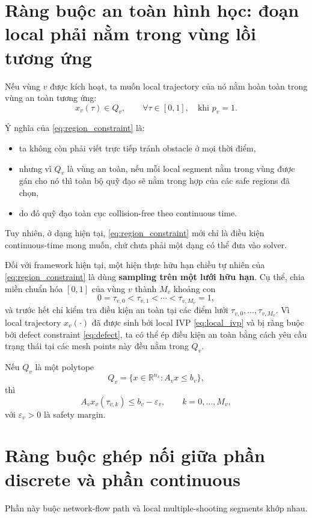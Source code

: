 \documentclass[12pt]{article}
\begin{document}
\section{Ràng buộc an toàn hình học: đoạn local phải nằm trong vùng lồi tương ứng}

Nếu vùng $v$ được kích hoạt, ta muốn local trajectory của nó nằm hoàn toàn trong vùng an toàn tương ứng:
\begin{equation}
x_v(\tau)\in Q_v,
\qquad \forall \tau\in[0,1],
\quad \text{khi } p_v=1.
\label{eq:region_constraint}
\end{equation}

Ý nghĩa của \eqref{eq:region_constraint} là:
\begin{itemize}
    \item ta không còn phải viết trực tiếp tránh obstacle ở mọi thời điểm,
    \item nhưng vì $Q_v$ là vùng an toàn, nếu mỗi local segment nằm trong vùng được gán cho nó thì toàn bộ quỹ đạo sẽ nằm trong hợp của các safe regions đã chọn,
    \item do đó quỹ đạo toàn cục collision-free theo continuous time.
\end{itemize}

Tuy nhiên, ở dạng hiện tại, \eqref{eq:region_constraint} mới chỉ là điều kiện continuous-time mong muốn, chứ chưa phải một dạng có thể đưa vào solver.

Đối với framework hiện tại, một hiện thực hữu hạn chiều tự nhiên của \eqref{eq:region_constraint} là dùng \textbf{sampling trên một lưới hữu hạn}. Cụ thể, chia miền chuẩn hóa $[0,1]$ của vùng $v$ thành $M_v$ khoảng con
\[
0=\tau_{v,0}<\tau_{v,1}<\cdots<\tau_{v,M_v}=1,
\]
và trước hết chỉ kiểm tra điều kiện an toàn tại các điểm lưới $\tau_{v,0},\dots,\tau_{v,M_v}$. Vì local trajectory $x_v(\cdot)$ đã được sinh bởi local IVP \eqref{eq:local_ivp} và bị ràng buộc bởi defect constraint \eqref{eq:defect}, ta có thể ép điều kiện an toàn bằng cách yêu cầu trạng thái tại các mesh points này đều nằm trong $Q_v$.

Nếu $Q_v$ là một polytope
\[
Q_v=\{x\in\mathbb R^{n_x}:A_vx\le b_v\},
\]
thì
\[
A_vx_v(\tau_{v,k})\le b_v-\varepsilon_v,
\qquad k=0,\dots,M_v,
\]
với $\varepsilon_v>0$ là safety margin.
\section{Ràng buộc ghép nối giữa phần discrete và phần continuous}

Phần này buộc network-flow path và local multiple-shooting segments khớp nhau.
\end{document}
